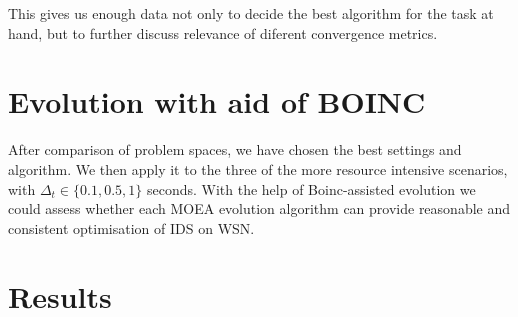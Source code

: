 \documentclass[12pt,oneside]{fithesis2}
\begin{document}
This gives us enough data not only to decide the best algorithm for the task at hand, but to further discuss relevance of diferent convergence metrics.

\section{Evolution with aid of BOINC}

After comparison of problem spaces, we have chosen the best settings and algorithm. We then apply it to the three of the more resource intensive scenarios, with $\Delta_t \in \{0.1,0.5,1\}$ seconds. With the help of Boinc-assisted evolution we could assess whether each MOEA evolution algorithm can provide reasonable and consistent optimisation of IDS on WSN.

\section{Results}





\end{document}
